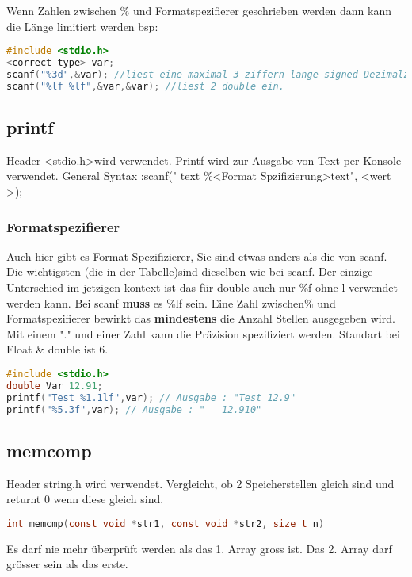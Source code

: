 Wenn Zahlen zwischen \% und Formatspezifierer geschrieben werden dann kann die Länge limitiert werden\newline
bsp:

\begin{lstlisting}[language = c]
#include <stdio.h>
<correct type> var;
scanf("%3d",&var); //liest eine maximal 3 ziffern lange signed Dezimalzahl ein.
scanf("%lf %lf",&var,&var); //liest 2 double ein.
\end{lstlisting}


\subsection{printf}

Header \textless stdio.h\textgreater wird verwendet.\newline
Printf wird zur Ausgabe von Text per Konsole verwendet.\newline
General Syntax :\newline scanf(" text \%\textless Format Spzifizierung\textgreater text", \textless wert \textgreater);

\subsubsection{Formatspezifierer}

Auch hier gibt es Format Spezifizierer, Sie sind etwas anders als die von scanf. Die wichtigsten (die in der Tabelle)sind dieselben wie bei scanf. Der einzige Unterschied im jetzigen kontext ist das für double auch nur \%f ohne l verwendet werden kann. Bei scanf \textbf{muss} es \%lf sein.\newline
Eine Zahl zwischen\% und Formatspezifierer bewirkt das \textbf{mindestens} die Anzahl Stellen ausgegeben wird. Mit einem "." und einer Zahl kann die Präzision spezifiziert werden. Standart bei Float \& double ist 6.


\begin{lstlisting}[language = c]
#include <stdio.h>
double Var 12.91;
printf("Test %1.1lf",var); // Ausgabe : "Test 12.9"
printf("%5.3f",var); // Ausgabe : "   12.910"
\end{lstlisting}

\subsection{memcomp}

Header string.h wird verwendet.\newline
Vergleicht, ob 2 Speicherstellen gleich sind und returnt 0 wenn diese gleich sind.
\begin{lstlisting}[language = c]
int memcmp(const void *str1, const void *str2, size_t n)
\end{lstlisting}
Es darf nie mehr überprüft werden als das 1. Array gross ist. Das 2. Array darf grösser sein als das erste.

